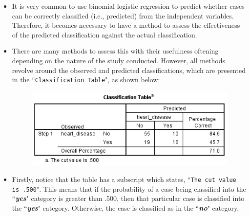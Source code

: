 \documentclass[a4paper,12pt]{article}
\begin{document}
\begin{itemize}
	\item It is very common to use binomial logistic regression to predict whether cases can be correctly classified (i.e., predicted) from the independent variables. Therefore, it becomes necessary to have a method to assess the effectiveness of the predicted classification against the actual classification.
	\item  There are many methods to assess this with their usefulness oftening depending on the nature of the study conducted. However, all methods revolve around the observed and predicted classifications, which are presented in the ``\texttt{Classification Table}", as shown below:
	
	
	\begin{figure}[h!]
		\centering
		\includegraphics[width=0.8\linewidth]{images/BLogReg-Table}
	\end{figure}
	
	
	
	\item Firstly, notice that the table has a subscript which states, ``\texttt{The cut value is .500}". This means that if the probability of a case being classified into the ``\textbf{\textit{yes}}" category is greater than .500, then that particular case is classified into the ``\textbf{\textit{yes}}" category. 
	Otherwise, the case is classified as in the ``\textbf{\textit{no}}" category. 
\end{itemize}
\end{document}
